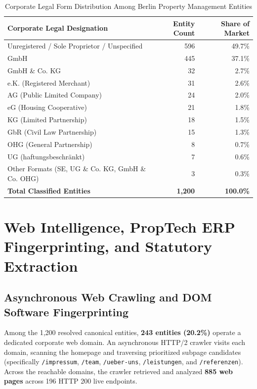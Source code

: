 \documentclass[11pt,a4paper]{article}
\begin{document}
\begin{table}[htbp]
\centering
\caption{Corporate Legal Form Distribution Among Berlin Property Management Entities}
\label{tab:legalforms}
\footnotesize
\begin{tabularx}{\textwidth}{l r r}
\toprule
\textbf{Corporate Legal Designation} & \textbf{Entity Count} & \textbf{Share of Market} \\
\midrule
Unregistered / Sole Proprietor / Unspecified & 596 & 49.7\% \\
GmbH & 445 & 37.1\% \\
GmbH \& Co. KG & 32 & 2.7\% \\
e.K. (Registered Merchant) & 31 & 2.6\% \\
AG (Public Limited Company) & 24 & 2.0\% \\
eG (Housing Cooperative) & 21 & 1.8\% \\
KG (Limited Partnership) & 18 & 1.5\% \\
GbR (Civil Law Partnership) & 15 & 1.3\% \\
OHG (General Partnership) & 8 & 0.7\% \\
UG (haftungsbeschr\"ankt) & 7 & 0.6\% \\
Other Formats (SE, UG \& Co. KG, GmbH \& Co. OHG) & 3 & 0.3\% \\
\midrule
\textbf{Total Classified Entities} & \textbf{1,200} & \textbf{100.0\%} \\
\bottomrule
\end{tabularx}
\end{table}

\section{Web Intelligence, PropTech ERP Fingerprinting, and Statutory Extraction}

\subsection{Asynchronous Web Crawling and DOM Software Fingerprinting}
Among the 1,200 resolved canonical entities, \textbf{243 entities (20.2\%)} operate a dedicated corporate web domain. An asynchronous HTTP/2 crawler visits each domain, scanning the homepage and traversing prioritized subpage candidates (specifically \texttt{/impressum}, \texttt{/team}, \texttt{/ueber-uns}, \texttt{/leistungen}, and \texttt{/referenzen}). Across the reachable domains, the crawler retrieved and analyzed \textbf{885 web pages} across 196 HTTP 200 live endpoints.
\end{document}
